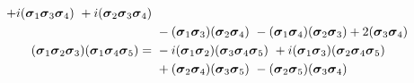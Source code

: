 \documentclass{beamer}
\begin{document}
\begin{frame}
\begin{align}
  +i(\ssigma_1\ssigma_3\ssigma_4)\
  +i(\ssigma_2\ssigma_3\ssigma_4) 		\nonumber\\  & \
  -(\ssigma_1\ssigma_3)(\ssigma_2\ssigma_4) \
  -(\ssigma_1\ssigma_4)(\ssigma_2\ssigma_3)
  +2 (\ssigma_3\ssigma_4)				%
  \\
  (\ssigma_1\ssigma_2\ssigma_3)(\ssigma_1\ssigma_4\ssigma_5) = & \
  -i(\ssigma_1 \ssigma_2)(\ssigma_3 \ssigma_4 \ssigma_5) \
  +i(\ssigma_1 \ssigma_3 )(\ssigma_2 \ssigma_4 \ssigma_5) \nonumber\\  & \
  +(\ssigma_2 \ssigma_4)(\ssigma_3 \ssigma_5)\
  -(\ssigma_2 \ssigma_5)(\ssigma_3 \ssigma_4) 		%
\end{align}
\normalsize

\end{frame}
\end{document}
